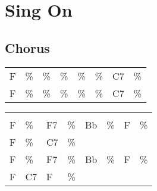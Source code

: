 \section{Sing On}


\subsection*{Chorus}


\begin{tabular}{l l l l l l l l}
F & \% & \% & \% & \% & \% & C7 & \% \\ 
F & \% & \% & \% & \% & \% & C7 & \% \\ 
\end{tabular}


\begin{tabular}{l l l l l l l l}
\\ \\ 
F & \% & F7 & \% & Bb & \% & F & \% \\ 
F & \% & C7 & \% \\ 
F & \% & F7 & \% & Bb & \% & F & \% \\ 
F & C7 & F & \% \\ 
\end{tabular}

